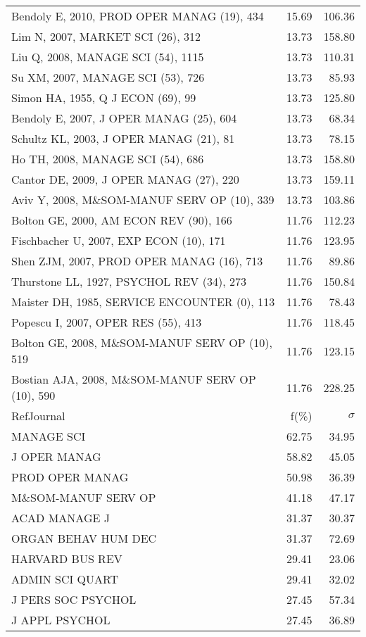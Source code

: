 \documentclass[a4paper,11pt]{report}
\begin{document}
\begin{landscape}
\begin{table}[!ht]
{\begin{tabular}{|l r r|}
Bendoly E, 2010, PROD OPER MANAG (19), 434 & 15.69 & 106.36\\
Lim N, 2007, MARKET SCI (26), 312 & 13.73 & 158.80\\
Liu Q, 2008, MANAGE SCI (54), 1115 & 13.73 & 110.31\\
Su XM, 2007, MANAGE SCI (53), 726 & 13.73 & 85.93\\
Simon HA, 1955, Q J ECON (69), 99 & 13.73 & 125.80\\
Bendoly E, 2007, J OPER MANAG (25), 604 & 13.73 & 68.34\\
Schultz KL, 2003, J OPER MANAG (21), 81 & 13.73 & 78.15\\
Ho TH, 2008, MANAGE SCI (54), 686 & 13.73 & 158.80\\
Cantor DE, 2009, J OPER MANAG (27), 220 & 13.73 & 159.11\\
Aviv Y, 2008, M\&SOM-MANUF SERV OP (10), 339 & 13.73 & 103.86\\
Bolton GE, 2000, AM ECON REV (90), 166 & 11.76 & 112.23\\
Fischbacher U, 2007, EXP ECON (10), 171 & 11.76 & 123.95\\
Shen ZJM, 2007, PROD OPER MANAG (16), 713 & 11.76 & 89.86\\
Thurstone LL, 1927, PSYCHOL REV (34), 273 & 11.76 & 150.84\\
Maister DH, 1985, SERVICE ENCOUNTER (0), 113 & 11.76 & 78.43\\
Popescu I, 2007, OPER RES (55), 413 & 11.76 & 118.45\\
Bolton GE, 2008, M\&SOM-MANUF SERV OP (10), 519 & 11.76 & 123.15\\
Bostian AJA, 2008, M\&SOM-MANUF SERV OP (10), 590 & 11.76 & 228.25\\
\hline
\hline
RefJournal & f(\%) & $\sigma$\\
\hline
MANAGE SCI & 62.75 & 34.95\\
J OPER MANAG & 58.82 & 45.05\\
PROD OPER MANAG & 50.98 & 36.39\\
M\&SOM-MANUF SERV OP & 41.18 & 47.17\\
ACAD MANAGE J & 31.37 & 30.37\\
ORGAN BEHAV HUM DEC & 31.37 & 72.69\\
HARVARD BUS REV & 29.41 & 23.06\\
ADMIN SCI QUART & 29.41 & 32.02\\
J PERS SOC PSYCHOL & 27.45 & 57.34\\
J APPL PSYCHOL & 27.45 & 36.89\\
\hline
\end{tabular}
}
\end{table}


\end{landscape}
\end{document}
